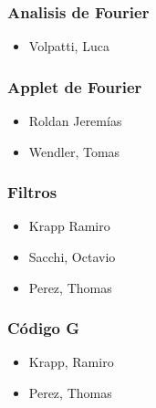 \documentclass{article}
\begin{document}
{		\subsubsection{Analisis de Fourier}
		\begin{itemize}
			\item Volpatti, Luca
		\end{itemize}

		\subsubsection{Applet de Fourier}
		\begin{itemize}
			\item Roldan Jeremías
			\item Wendler, Tomas
		\end{itemize}

		\subsubsection{Filtros}
		\begin{itemize}
			\item Krapp Ramiro
			\item Sacchi, Octavio
			\item Perez, Thomas
		\end{itemize}

		\subsubsection{Código G}
		\begin{itemize}
			\item Krapp, Ramiro
			\item Perez, Thomas
		\end{itemize}

}

{
	
	\clearpage
}

{
	
	\clearpage
}

{
	
	\clearpage
}

{
	
	\clearpage
	
}	

{
	
	\clearpage
}
{
	
	\clearpage
}
\end{document}
